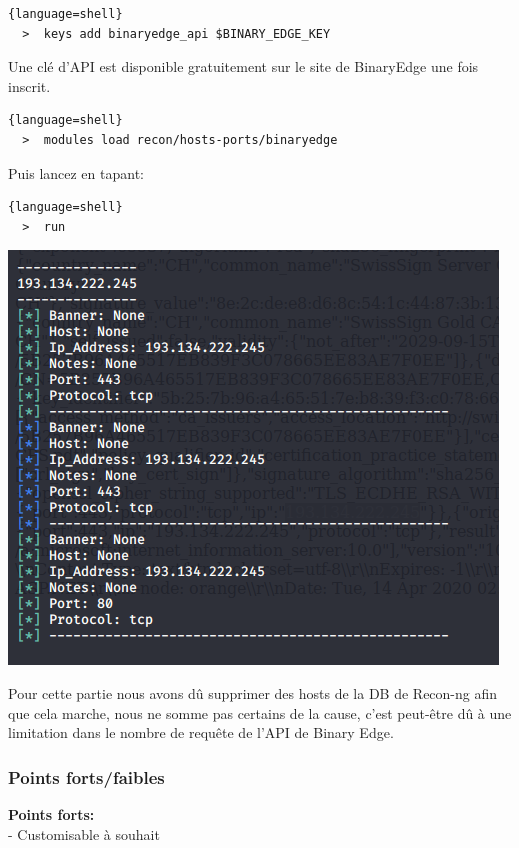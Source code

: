 \begin{lstlisting}{language=shell}
  >  keys add binaryedge_api $BINARY_EDGE_KEY
\end{lstlisting}

Une clé d'API est disponible gratuitement sur le site de BinaryEdge une fois inscrit.

\begin{lstlisting}{language=shell}
  >  modules load recon/hosts-ports/binaryedge
\end{lstlisting}

Puis lancez en tapant:

\begin{lstlisting}{language=shell}
  >  run
\end{lstlisting}

\includegraphics[scale=0.48]{images/SEN_Projet_Image023.png}

Pour cette partie nous avons dû supprimer des hosts de la DB de Recon-ng afin que cela marche,
nous ne somme pas certains de la cause, c'est peut-être dû à une limitation dans le nombre de requête de l'API de Binary Edge.

\subsubsection{Points forts/faibles}

{\bfseries Points forts:} \\

- Customisable à souhait

